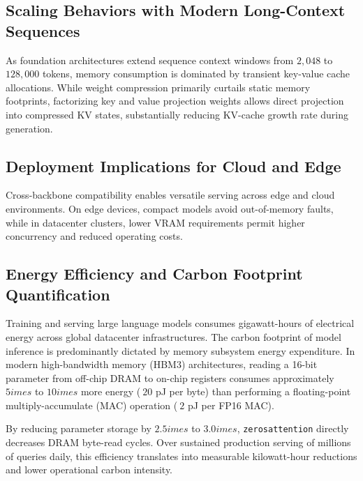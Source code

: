 \subsection{Scaling Behaviors with Modern Long-Context Sequences}
As foundation architectures extend sequence context windows from $2{,}048$ to $128{,}000$ tokens, memory consumption is dominated by transient key-value cache allocations. While weight compression primarily curtails static memory footprints, factorizing key and value projection weights allows direct projection into compressed KV states, substantially reducing KV-cache growth rate during generation.

\subsection{Deployment Implications for Cloud and Edge}
Cross-backbone compatibility enables versatile serving across edge and cloud environments. On edge devices, compact models avoid out-of-memory faults, while in datacenter clusters, lower VRAM requirements permit higher concurrency and reduced operating costs.

\subsection{Energy Efficiency and Carbon Footprint Quantification}
Training and serving large language models consumes gigawatt-hours of electrical energy across global datacenter infrastructures. The carbon footprint of model inference is predominantly dictated by memory subsystem energy expenditure. In modern high-bandwidth memory (HBM3) architectures, reading a 16-bit parameter from off-chip DRAM to on-chip registers consumes approximately $5	imes$ to $10	imes$ more energy ($~20$ pJ per byte) than performing a floating-point multiply-accumulate (MAC) operation ($~2$ pJ per FP16 MAC).

By reducing parameter storage by $2.5	imes$ to $3.0	imes$, \texttt{zerosattention} directly decreases DRAM byte-read cycles. Over sustained production serving of millions of queries daily, this efficiency translates into measurable kilowatt-hour reductions and lower operational carbon intensity.
